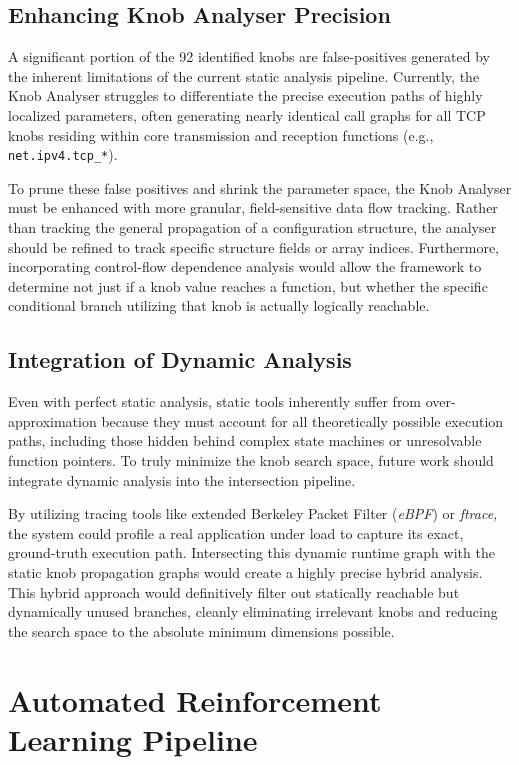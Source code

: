 \subsection{Enhancing Knob Analyser Precision}

A significant portion of the 92 identified knobs are false-positives generated by the inherent limitations of the current static analysis pipeline.
Currently, the Knob Analyser struggles to differentiate the precise execution paths of highly localized parameters, often generating nearly identical call graphs for all TCP knobs residing within core transmission and reception functions (e.g., \texttt{net.ipv4.tcp\_*}).

To prune these false positives and shrink the parameter space, the Knob Analyser must be enhanced with more granular, field-sensitive data flow tracking.
Rather than tracking the general propagation of a configuration structure, the analyser should be refined to track specific structure fields or array indices.
Furthermore, incorporating control-flow dependence analysis would allow the framework to determine not just if a knob value reaches a function, but whether the specific conditional branch utilizing that knob is actually logically reachable.

\subsection{Integration of Dynamic Analysis}

Even with perfect static analysis, static tools inherently suffer from over-approximation because they must account for all theoretically possible execution paths, including those hidden behind complex state machines or unresolvable function pointers.
To truly minimize the knob search space, future work should integrate dynamic analysis into the intersection pipeline.

By utilizing tracing tools like extended Berkeley Packet Filter (\textit{eBPF}) or \textit{ftrace,} the system could profile a real application under load to capture its exact, ground-truth execution path.
Intersecting this dynamic runtime graph with the static knob propagation graphs would create a highly precise hybrid analysis.
This hybrid approach would definitively filter out statically reachable but dynamically unused branches, cleanly eliminating irrelevant knobs and reducing the search space to the absolute minimum dimensions possible.

\section{Automated Reinforcement Learning Pipeline}

